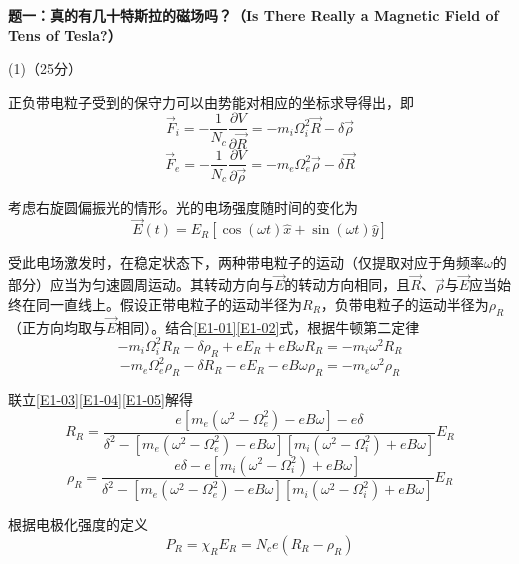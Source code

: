 \documentclass[10pt,a4paper,onecolumn,UTF8]{ctexart}
\begin{document}
	\noindent
	\textbf{题一：真的有几十特斯拉的磁场吗？（Is There Really a Magnetic Field of Tens of Tesla?）}
	
	(1)（25分）
	
	正负带电粒子受到的保守力可以由势能对相应的坐标求导得出，即
	\begin{equation}\label{E1-01}
		\vec F_i=-\frac{1}{N_c}\frac{\partial V}{\partial \vec R}=-m_i\Omega_i^2\vec R-\delta\vec \rho
	\end{equation}
	\begin{equation}\label{E1-02}
		\vec F_e=-\frac{1}{N_c}\frac{\partial V}{\partial \vec\rho}=-m_e\Omega_e^2\vec \rho-\delta\vec R
	\end{equation}
	
	考虑右旋圆偏振光的情形。光的电场强度随时间的变化为
	\begin{equation}\label{E1-03}
		\vec E(t)=E_R[\cos(\omega t)\hat x+\sin(\omega t)\hat y]
	\end{equation}
	
	受此电场激发时，在稳定状态下，两种带电粒子的运动（仅提取对应于角频率$\omega$的部分）应当为匀速圆周运动。其转动方向与$\vec E$的转动方向相同，且$\vec R$、$\vec\rho$与$\vec E$应当始终在同一直线上。假设正带电粒子的运动半径为$R_R$，负带电粒子的运动半径为$\rho_R$（正方向均取与$\vec E$相同）。结合\eqref{E1-01}\eqref{E1-02}式，根据牛顿第二定律
	\begin{equation}\label{E1-04}
		-m_i\Omega_i^2 R_R-\delta\rho_R+e E_R+eB\omega R_R=-m_i\omega^2R_R
	\end{equation}
	\begin{equation}\label{E1-05}
		-m_e\Omega_e^2\rho_R-\delta R_R-e E_R-eB\omega \rho_R=-m_e\omega^2\rho_R
	\end{equation}
	
	联立\eqref{E1-03}\eqref{E1-04}\eqref{E1-05}解得
	\begin{equation}\label{E1-06}
		R_R=\frac{e\left[m_e(\omega^2-\Omega_e^2)-eB\omega\right]-e\delta}{\delta^2-\left[m_e(\omega^2-\Omega_e^2)-eB\omega\right]\left[m_i(\omega^2-\Omega_i^2)+eB\omega\right]}E_R
	\end{equation}
	\begin{equation}\label{E1-07}
		\rho_R=\frac{e\delta-e\left[m_i(\omega^2-\Omega_i^2)+eB\omega\right]}{\delta^2-\left[m_e(\omega^2-\Omega_e^2)-eB\omega\right]\left[m_i(\omega^2-\Omega_i^2)+eB\omega\right]}E_R
	\end{equation}
	
	根据电极化强度的定义
	\begin{equation}\label{E1-08}
		P_R=\chi_RE_R=N_ce(R_R-\rho_R)
	\end{equation}
	
\end{document}
